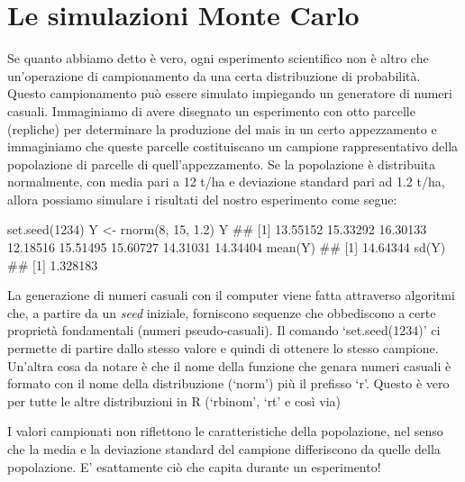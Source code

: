 \documentclass[a4paper,12pt,oneside]{book}
\newenvironment{Shaded}{}{}
\newcommand{\KeywordTok}[1]{#1}
\newcommand{\DecValTok}[1]{#1}
\newcommand{\FloatTok}[1]{#1}
\newcommand{\StringTok}[1]{#1}
\newcommand{\CommentTok}[1]{#1}
\newcommand{\NormalTok}[1]{#1}
\begin{document}
\hypertarget{le-simulazioni-monte-carlo}{%
\section{Le simulazioni Monte Carlo}\label{le-simulazioni-monte-carlo}}

Se quanto abbiamo detto è vero, ogni esperimento scientifico non è altro che un'operazione di campionamento da una certa distribuzione di probabilità. Questo campionamento può essere simulato impiegando un generatore di numeri casuali. Immaginiamo di avere disegnato un esperimento con otto parcelle (repliche) per determinare la produzione del mais in un certo appezzamento e immaginiamo che queste parcelle costituiscano un campione rappresentativo della popolazione di parcelle di quell'appezzamento. Se la popolazione è distribuita normalmente, con media pari a 12 t/ha e deviazione standard pari ad 1.2 t/ha, allora possiamo simulare i risultati del nostro esperimento come segue:

\begin{Shaded}
\begin{Highlighting}[]
\KeywordTok{set.seed}\NormalTok{(}\DecValTok{1234}\NormalTok{)}
\NormalTok{Y <-}\StringTok{ }\KeywordTok{rnorm}\NormalTok{(}\DecValTok{8}\NormalTok{, }\DecValTok{15}\NormalTok{, }\FloatTok{1.2}\NormalTok{)}
\NormalTok{Y}
\CommentTok{## [1] 13.55152 15.33292 16.30133 12.18516 15.51495 15.60727 14.31031 14.34404}
\KeywordTok{mean}\NormalTok{(Y)}
\CommentTok{## [1] 14.64344}
\KeywordTok{sd}\NormalTok{(Y)}
\CommentTok{## [1] 1.328183}
\end{Highlighting}
\end{Shaded}

La generazione di numeri casuali con il computer viene fatta attraverso algoritmi che, a partire da un \emph{seed} iniziale, forniscono sequenze che obbediscono a certe proprietà fondamentali (numeri pseudo-casuali). Il comando `set.seed(1234)' ci permette di partire dallo stesso valore e quindi di ottenere lo stesso campione. Un'altra cosa da notare è che il nome della funzione che genara numeri casuali è formato con il nome della distribuzione (`norm') più il prefisso `r'. Questo è vero per tutte le altre distribuzioni in R (`rbinom', `rt' e così via)

I valori campionati non riflettono le caratteristiche della popolazione, nel senso che la media e la deviazione standard del campione differiscono da quelle della popolazione. E' esattamente ciò che capita durante un esperimento!
\end{document}

